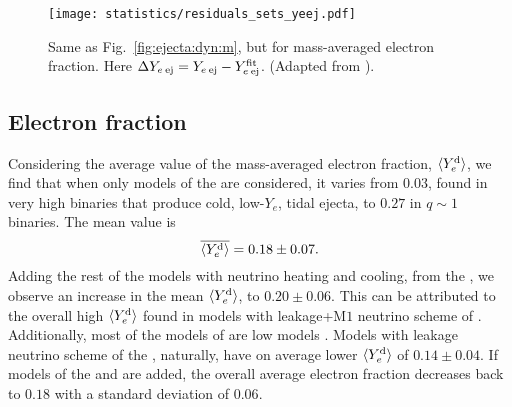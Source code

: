 
\begin{figure}[t!]
    \centering 
    \texttt{[image: statistics/residuals\_sets\_yeej.pdf]}
    \caption{
        Same as Fig.~\ref{fig:ejecta:dyn:m}, but for mass-averaged electron fraction.
        Here $\Delta Y_{e\: \rm ej} = Y_{e\: \rm ej} - Y^{\rm fit}_{e\: \rm ej}$.
        (Adapted from \citet{Nedora:2020qtd}).
    }
    \label{fig:ejecta:dyn:y}
\end{figure}

\subsection{Electron fraction} 

Considering the average value of the mass-averaged electron fraction, $\langle Y^{\text{d}}_{e}\rangle$, we find 
that when only models of the \DSrefset{} are considered, 
it varies from $0.03$, found in very high \mr{} binaries 
that produce cold, low-$Y_e$, tidal ejecta, to $0.27$ in $q\sim1$ 
binaries. %
%
The mean value is 
%
\begin{equation}
\label{eq:ejecta:dyn:avg:y}
\overline{\langle Y^{\text{d}}_{e}\rangle} = 0.18 \pm 0.07.
\end{equation}
%
Adding the rest of the models with neutrino heating and cooling, 
from the \DSheatcool{}, we observe
an increase in the mean $\langle Y^{\text{d}}_{e}\rangle$, to $0.20 \pm 0.06$. This can be attributed to the overall 
high $\langle Y^{\text{d}}_{e}\rangle$ found in models with leakage+M$1$ neutrino scheme of 
\citet{Sekiguchi:2015dma,Sekiguchi:2016bjd}. 
Additionally, most of the models of \DSheatcool{} are low \mr{} models 
\citep[\eg][]{Vincent:2019kor}.
%
Models with leakage neutrino scheme of the \DScool{}, naturally, have on average lower 
$\langle Y^{\text{d}}_{e}\rangle$ of $0.14 \pm 0.04$. If models of the \DSheatcool{} and \DSrefset{} are added, the overall average 
electron fraction decreases back to $0.18$ with a standard deviation of $0.06$.



